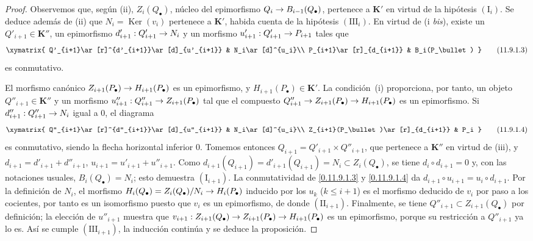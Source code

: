 \documentclass[10pt,oneside,openany]{book}
\theoremstyle{egaenv}\newtheorem*{env}{---}
\theoremstyle{egastatement}
\theoremstyle{egadescription}
\newcommand{\oldpage}[2][]{\marginnote{\normalfont\scriptsize\textbf{#1}\,|\,#2}\ignorespaces}
\renewcommand{\leq}{\leqslant}
\renewcommand{\to}{\mathchoice{\longrightarrow}{\rightarrow}{\rightarrow}{\rightarrow}}
\begin{document}
\begin{proof}
Observemos que, según (ii), $Z_i(Q_\bullet)$, núcleo del epimorfismo $Q_i\to B_{i-1}(Q_\bullet)$, pertenece a $\boldsymbol{K}'$ en virtud de la hipótesis $(\mathrm I_i)$. Se deduce además de (ii) que
$N_i=\operatorname{Ker}(v_i)$
pertenece a $\boldsymbol{K}'$, habida cuenta de la hipótesis $(\mathrm{III}_i)$. En virtud de (i \emph{bis}), existe un $Q'_{i+1}\in\boldsymbol{K}''$, un epimorfismo
$d'_{i+1}:Q'_{i+1}\to N_i$
y un morfismo $u'_{i+1}:Q'_{i+1}\to P_{i+1}$ tales que
\[
\xymatrix{
Q'_{i+1}\ar[r]^{d'_{i+1}}\ar[d]_{u'_{i+1}} &
N_i\ar[d]^{u_i}\\
P_{i+1}\ar[r]_{d_{i+1}} & B_i(P_\bullet)
}
\tag{11.9.1.3}\label{0.11.9.1.3-fr}
\]
es conmutativo.

El morfismo canónico
$Z_{i+1}(P_\bullet)\to H_{i+1}(P_\bullet)$
es un epimorfismo, y $H_{i+1}(P_\bullet)\in\boldsymbol{K}'$.
La condición~(i) proporciona, por tanto, un objeto $Q''_{i+1}\in\boldsymbol{K}''$ y un
morfismo
$u''_{i+1}:Q''_{i+1}\to Z_{i+1}(P_\bullet)$
tal que el compuesto
$Q''_{i+1}\to Z_{i+1}(P_\bullet)\to H_{i+1}(P_\bullet)$
es un epimorfismo.
Si $d''_{i+1}:Q''_{i+1}\to N_i$ igual a $0$, el diagrama
\[
\xymatrix{
Q''_{i+1}\ar[r]^{d''_{i+1}}\ar[d]_{u''_{i+1}} &
N_i\ar[d]^{u_i}\\
Z_{i+1}(P_\bullet)\ar[r]_{d_{i+1}} & P_i
}
\tag{11.9.1.4}\label{0.11.9.1.4-fr}
\]
\oldpage[0\textsubscript{III}]{48}
es conmutativo, siendo la flecha horizontal inferior $0$. Tomemos entonces $Q_{i+1}=Q'_{i+1}\times Q''_{i+1}$, que pertenece a $\boldsymbol{K}''$ en virtud de (iii), y $d_{i+1}=d'_{i+1}+d''_{i+1}$, $u_{i+1}=u'_{i+1}+u''_{i+1}$. Como $d_{i+1}(Q_{i+1})=d'_{i+1}(Q_{i+1})=N_i\subset Z_i(Q_\bullet)$, se tiene $d_i\circ d_{i+1}=0$ y, con las notaciones usuales,
$B_i(Q_\bullet)=N_i$; esto demuestra
$(\mathrm I_{i+1})$.
La conmutatividad de \eqref{0.11.9.1.3} y
\eqref{0.11.9.1.4} da
$d_{i+1}\circ u_{i+1}=u_i\circ d_{i+1}$.
Por la definición de $N_i$, el morfismo
$H_i(Q_\bullet)=Z_i(Q_\bullet)/N_i\to H_i(P_\bullet)$
inducido por los $u_k$ ($k\leq i+1$) es el morfismo deducido de $v_i$ por paso a los cocientes, por tanto es un isomorfismo puesto que $v_i$ es un epimorfismo, de donde $(\mathrm{II}_{i+1})$. Finalmente, se tiene $Q''_{i+1}\subset Z_{i+1}(Q_\bullet)$ por definición; la elección de $u''_{i+1}$ muestra que
$v_{i+1}:Z_{i+1}(Q_\bullet)\to Z_{i+1}(P_\bullet)
\to H_{i+1}(P_\bullet)$
es un epimorfismo, porque su restricción a $Q''_{i+1}$ ya lo
es.
Así se cumple $(\mathrm{III}_{i+1})$, la inducción continúa y se deduce la
proposición.
\end{proof}
\end{document}
